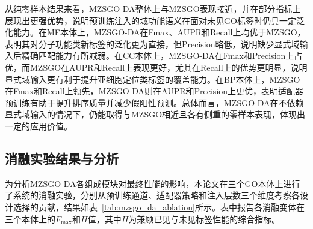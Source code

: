从纯零样本结果来看，MZSGO-DA整体上与MZSGO表现接近，并在部分指标上展现出更强优势，说明预训练注入的域功能语义在面对未见GO标签时仍具一定泛化能力。在MF本体上，MZSGO-DA在Fmax、AUPR和Recall上均优于MZSGO，表明其对分子功能类新标签的泛化更为直接，但Precision略低，说明缺少显式域输入后精确匹配能力有所减弱。在CC本体上，MZSGO-DA在Fmax和Precision上占优，而MZSGO在AUPR和Recall上表现更好，尤其在Recall上的优势更明显，说明显式域输入更有利于提升亚细胞定位类标签的覆盖能力。在BP本体上，MZSGO在Fmax和Recall上领先，MZSGO-DA则在AUPR和Precision上更优，表明适配器预训练有助于提升排序质量并减少假阳性预测。总体而言，MZSGO-DA在不依赖显式域输入的情况下，仍能取得与MZSGO相近且各有侧重的零样本表现，体现出一定的应用价值。

\subsection{消融实验结果与分析}

为分析MZSGO-DA各组成模块对最终性能的影响，本论文在三个GO本体上进行了系统的消融实验，分别从预训练通道、适配器策略和注入层数三个维度考察各设计选择的贡献，结果如表~\ref{tab:mzsgo_da_ablation}所示。表中报告各消融变体在三个本体上的$F_{\max}$和$H$值，其中$H$为兼顾已见与未见标签性能的综合指标。

